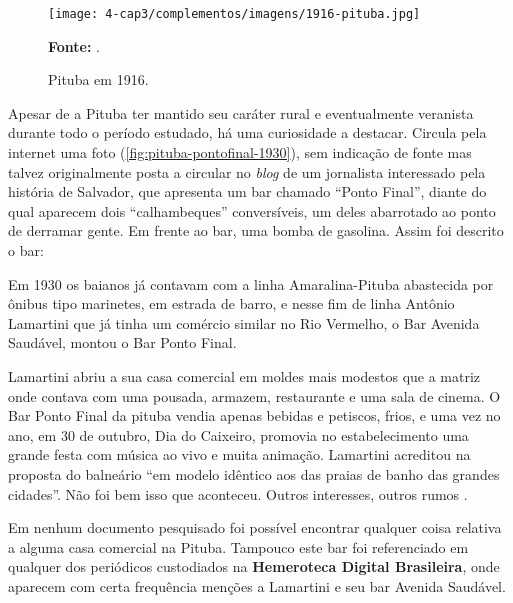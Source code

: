 \begin{figure}[!htp]
\centering
\caption{Pituba em 1916.}
\texttt{[image: 4-cap3/complementos/imagens/1916-pituba.jpg]}{\par \footnotesize \textbf{Fonte:} .}
\label{fig:pituba1916}
\end{figure}

Apesar de a Pituba ter mantido seu caráter rural e eventualmente veranista durante todo o período estudado, há uma curiosidade a destacar. Circula pela internet uma foto (\autoref{fig:pituba-pontofinal-1930}), sem indicação de fonte mas talvez originalmente posta a circular no \textit{blog} de um jornalista interessado pela história de Salvador, que apresenta um bar chamado ``Ponto Final'', diante do qual aparecem dois ``calhambeques'' conversíveis, um deles abarrotado ao ponto de derramar gente. Em frente ao bar, uma bomba de gasolina. Assim foi descrito o bar:

\begin{citacao}
Em 1930 os baianos já contavam com a linha Amaralina-Pituba abastecida por ônibus tipo marinetes, em estrada de barro, e nesse fim de linha Antônio Lamartini que já tinha um comércio similar no Rio Vermelho, o Bar Avenida Saudável, montou o Bar Ponto Final.

Lamartini abriu a sua casa comercial em moldes mais modestos que a matriz onde contava com uma pousada, armazem, restaurante e uma sala de cinema. O Bar Ponto Final da pituba vendia apenas bebidas e petiscos, frios, e uma vez no ano, em 30 de outubro, Dia do Caixeiro, promovia no estabelecimento uma grande festa com música ao vivo e muita animação. Lamartini acreditou na proposta do balneário ``em modelo idêntico aos das praias de banho das grandes cidades''. Não foi bem isso que aconteceu. Outros interesses, outros rumos \cite{cadena_pituba_2012}.
\end{citacao}

Em nenhum documento pesquisado foi possível encontrar qualquer coisa relativa a alguma casa comercial na Pituba. Tampouco este bar foi referenciado em qualquer dos periódicos custodiados na \textbf{Hemeroteca Digital Brasileira}, onde aparecem com certa frequência menções a Lamartini e seu bar Avenida Saudável.

